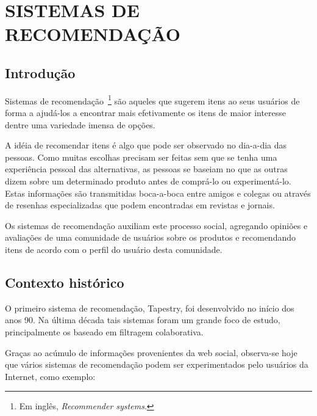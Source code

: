 \chapter{SISTEMAS DE RECOMENDAÇÃO} %
\label{cha:sistemas_de_recomendação}

\section{Introdução}
Sistemas de recomendação~\footnote{Em inglês, \textit{Recommender systems}.} são aqueles que sugerem itens ao seus usuários de forma a ajudá-los a encontrar mais efetivamente os itens de maior interesse dentre uma variedade imensa de opções.

A idéia de recomendar itens é algo que pode ser observado no dia-a-dia das pessoas. Como muitas escolhas precisam ser feitas sem que se tenha uma experiência pessoal das alternativas, as pessoas se baseiam no que as outras dizem sobre um determinado produto antes de comprá-lo ou experimentá-lo. Estas informações são transmitidas boca-a-boca entre amigos e colegas ou através de resenhas especializadas que podem encontradas em revistas e jornais.

Os sistemas de recomendação auxiliam este processo social, agregando opiniões e avaliações de uma comunidade de usuários sobre os produtos e recomendando itens de acordo com o perfil do usuário desta comunidade.

\section{Contexto histórico}
O primeiro sistema de recomendação, Tapestry\cite{Goldberg92}, foi desenvolvido no início dos anos 90. Na última década tais sistemas foram um grande foco de estudo, principalmente os baseado em filtragem colaborativa.~\cite{Resnick97}~\cite{Herlocker04}

Graças ao acúmulo de informações provenientes da web social, observa-se hoje que vários sistemas de recomendação podem ser experimentados pelo usuários da Internet, como exemplo:

